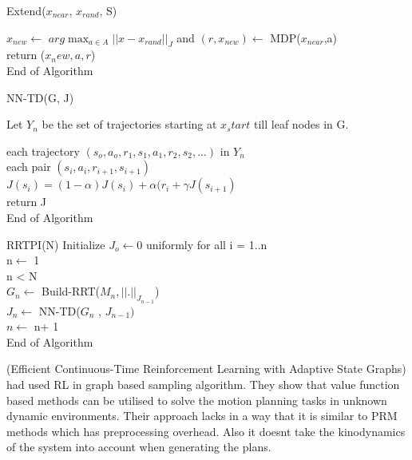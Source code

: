 \documentclass[MTech]{iitmdiss}
\begin{document}
\begin{algorithm}{Extend($x_{near}$, $x_{rand}$, S)}{
\label{algo:Extend}
}

 $x_{new} \leftarrow$  $\displaystyle arg\max_{a \in A} ||x - x_{rand} ||_J $ and $(r,x_{new} ) \leftarrow$ MDP($x_{near}$,a)\\ 
 return ($x_new, a, r$)\\
End of Algorithm
\end{algorithm}

\begin{algorithm}{NN-TD(G, J)}{
\label{algo:NN-TD}
}

Let $Y_n$ be the set of trajectories starting at $x_start$ till leaf nodes in G.

\qfor each trajectory $(s_o, a_o, r_1, s_1, a_1, r_2, s_2, ...)$ in $Y_n$\\
\qfor each pair $(s_i,a_i,r_{i+1}, s_{i+1})$\\
$J(s_i) = (1 - \alpha) J(s_i) + \alpha(r_i + \gamma J(s_{i+1})$\qrof\qrof\\
return J\\
End of Algorithm
\end{algorithm}



\begin{algorithm}{RRTPI(N)}{
\label{algo:RRTPI}
}
Initialize $J_o \leftarrow 0$ uniformly for all i = 1$..$n\\
n$\leftarrow$ 1\\
\qwhile n < N \\
$G_n \leftarrow$ Build-RRT($M_n,|| . ||_{J_{n-1}} $)\\
$J_n \leftarrow$ NN-TD($G_n$ , $J_{n-1})$\\
$n \leftarrow$ n+ 1\qend\\
End of Algorithm
\end{algorithm}

(Efficient Continuous-Time Reinforcement Learning with Adaptive State Graphs) had used RL in graph based sampling algorithm. They show that value function based methods can be utilised to solve the motion planning tasks in unknown dynamic environments. Their approach lacks in a way that it is similar to PRM methods which has preprocessing overhead. Also it doesnt take the kinodynamics of the system into account when generating the plans.
\end{document}
